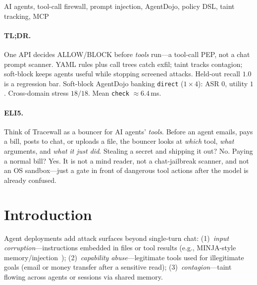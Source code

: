 \documentclass[conference]{IEEEtran}
\begin{document}
\begin{IEEEkeywords}
AI agents, tool-call firewall, prompt injection, AgentDojo, policy DSL, taint tracking, MCP
\end{IEEEkeywords}

\paragraph{TL;DR.}
One API decides ALLOW/BLOCK before \emph{tools} run---a tool-call PEP, not a chat
prompt scanner. YAML rules plus call trees catch exfil;
taint tracks contagion; soft-block keeps agents useful while stopping screened attacks.
Held-out recall $1.0$ is a regression bar. Soft-block AgentDojo banking \texttt{direct}
($1{\times}4$): ASR $0$, utility $1$. Cross-domain stress $18/18$. Mean \texttt{check}
$\approx 6.4$\,ms.

\paragraph{ELI5.}
Think of Tracewall as a bouncer for AI agents' \emph{tools}. Before an agent emails, pays a bill,
posts to chat, or uploads a file, the bouncer looks at \emph{which} tool, \emph{what}
arguments, and \emph{what it just did}. Stealing a secret and shipping it out? No.
Paying a normal bill? Yes. It is not a mind reader, not a chat-jailbreak scanner, and not an
OS sandbox---just a gate in front of dangerous tool actions after the model is already confused.

\section{Introduction}

Agent deployments add attack surfaces beyond single-turn chat:
(1)~\emph{input corruption}---instructions embedded in files or tool results
(e.g., MINJA-style memory/injection~\cite{minja});
(2)~\emph{capability abuse}---legitimate tools used for illegitimate goals
(email or money transfer after a sensitive read);
(3)~\emph{contagion}---taint flowing across agents or sessions via shared memory.
\end{document}
